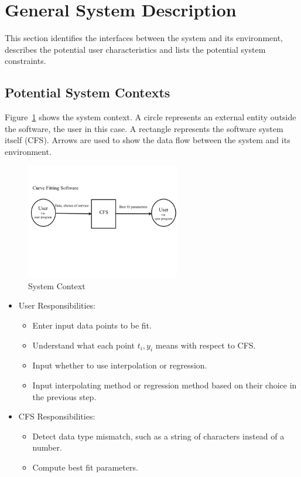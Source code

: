 \documentclass[12pt]{article}
\newcommand{\famname}{CFS} %
\begin{document}
\section{General System Description}

This section identifies the interfaces between the system and its environment,
describes the potential user characteristics and lists the potential system
constraints.

\subsection{Potential System Contexts}

Figure~\ref{Fig_SystemContext} shows the system context.  A circle represents an
external entity outside the software, the user in this case.  A rectangle
represents the software system itself (\famname{}).  Arrows are used to show
the data
flow between the system and its environment.

\begin{figure}[h!]
	\begin{center}
		\includegraphics[width=0.6\textwidth]{SystemContextFigure.png}
		\caption{System Context}
		\label{Fig_SystemContext} 
	\end{center}
\end{figure}


\begin{itemize}
\item User Responsibilities:
\begin{itemize}
\item Enter input data points to be fit.
\item Understand what each point $t_i, y_i$ means with respect to \famname{}.
\item Input whether to use interpolation or regression.
\item Input interpolating method or regression method based on their choice in the previous step. 
\end{itemize}
\item \famname{} Responsibilities:
\begin{itemize}
\item Detect data type mismatch, such as a string of characters instead of a number.
\item Compute best fit parameters.
\end{itemize}
\end{itemize}
\end{document}
